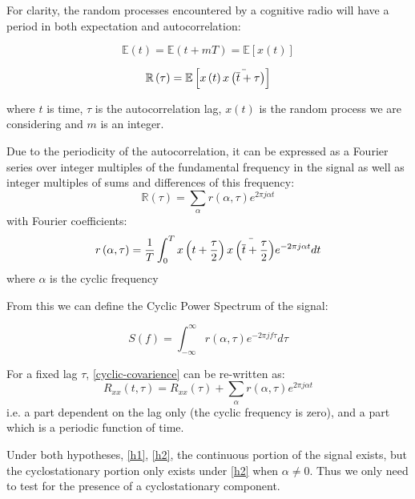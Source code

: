 For clarity, the random processes encountered by a cognitive radio will have a period in both expectation and autocorrelation:

\begin{equation}
\mathbb{E}\left(t\right) = \mathbb{E}\left(t + mT\right) = \mathbb{E}\left[x\left(t\right)\right]
\end{equation}

\begin{equation}
\mathbb{R}\left(\tau\right) = \mathbb{E}\left[x\left(t\right)\bar{x\left(\overline{t} +\tau\right)}\right]
\end{equation}

where \(t\) is time, \(\tau\) is the autocorrelation lag, \(x\left(t\right)\) is the random process we are considering and \(m\) is an integer. 

Due to the periodicity of the autocorrelation, it can be expressed as a Fourier series over integer multiples of the fundamental frequency in the signal as well as integer multiples of sums and differences of this frequency:
%
\begin{equation}
\mathbb{R}\left(\tau\right) = \sum_{\alpha} r\left(\alpha, \tau\right) e^{2\pi j \alpha t}  
\end{equation}
\label{cyclic-covarience}
%
with Fourier coefficients:
%
\begin{equation}
r\left(\alpha, \tau\right) = \frac{1}{T} \int_{0}^T x\left(t+\frac{\tau}{2}\right)\bar{x\left(\overline{t}+\frac{\tau}{2}\right)} e^{-2\pi j \alpha t} dt
\end{equation}
%
where \(\alpha\) is the cyclic frequency

From this we can define the Cyclic Power Spectrum of the signal:

\begin{equation}
S\left(f\right) = \int_{-\infty}^{\infty} r\left(\alpha, \tau\right) e^{-2 \pi j f \tau} d\tau
\end{equation}

For a fixed lag \(\tau\), \eqref{cyclic-covarience} can be re-written as:
%
\begin{equation}
R_{xx}\left(t, \tau \right) = R_{xx}\left(\tau\right) + \sum_{\alpha} r\left(\alpha, \tau\right) e^{2\pi j \alpha t}  
\end{equation}
%
i.e. a part dependent on the lag only (the cyclic frequency is zero), and a part which is a periodic function of time. 

Under both hypotheses, \eqref{h1}, \eqref{h2}, the continuous portion of the signal exists, but the cyclostationary portion only exists under \eqref{h2} when \(\alpha \neq 0\). Thus we only need to test for the presence of a cyclostationary component. 

